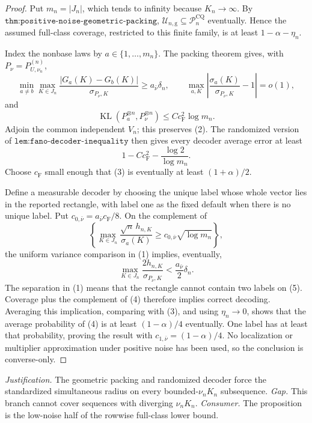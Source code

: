 \documentclass{article}
\begin{document}
\begin{proof}
Put \(m_n=|J_n|\), which tends to infinity because \(K_n\to\infty\).  By \(\texttt{thm:positive-noise-geometric-packing}\), \(\mathcal U_{n,\mathrm g}\subseteq\mathcal P_n^{\mathrm{CQ}}\) eventually.  Hence the assumed full-class coverage, restricted to this finite family, is at least \(1-\alpha-\eta_n\).

Index the nonbase laws by \(a\in\{1,\ldots,m_n\}\).  The packing theorem gives, with \(P_\nu=P_{U,\nu_n}^{(n)}\),
\[
 \min_{a\ne b}\max_{K\in J_n}
 \frac{|G_a(K)-G_b(K)|}{\sigma_{P_\nu,K}}
 \geq a_{\bar\nu}\delta_n,\qquad
 \max_{a,K}\left|\frac{\sigma_a(K)}{\sigma_{P_\nu,K}}-1\right|=o(1),                  \tag{1}
\]
and
\[
 \operatorname{KL}(P_a^{\otimes n},P_\nu^{\otimes n})
 \leq Cc_{\mathrm F}^2\log m_n.                                                         \tag{2}
\]
Adjoin the common independent \(V_n\); this preserves (2).  The randomized version of \(\texttt{lem:fano-decoder-inequality}\) then gives every decoder average error at least
\[
 1-Cc_{\mathrm F}^2-\frac{\log2}{\log m_n}.                                             \tag{3}
\]
Choose \(c_{\mathrm F}\) small enough that (3) is eventually at least \((1+\alpha)/2\).

Define a measurable decoder by choosing the unique label whose whole vector lies in the reported rectangle, with label one as the fixed default when there is no unique label.  Put \(c_{0,\bar\nu}=a_{\bar\nu}c_{\mathrm F}/8\).  On the complement of
\[
 \left\{\max_{K\in J_n}\frac{\sqrt n\,h_{n,K}}{\sigma_a(K)}
 \geq c_{0,\bar\nu}\sqrt{\log m_n}\right\},                                          \tag{4}
\]
the uniform variance comparison in (1) implies, eventually,
\[
 \max_{K\in J_n}\frac{2h_{n,K}}{\sigma_{P_\nu,K}}
 <\frac{a_{\bar\nu}}2\delta_n.                                                         \tag{5}
\]
The separation in (1) means that the rectangle cannot contain two labels on (5).  Coverage plus the complement of (4) therefore implies correct decoding.  Averaging this implication, comparing with (3), and using \(\eta_n\to0\), shows that the average probability of (4) is at least \((1-\alpha)/4\) eventually.  One label has at least that probability, proving the result with \(c_{1,\bar\nu}=(1-\alpha)/4\).  No localization or multiplier approximation under positive noise has been used, so the conclusion is converse-only.
\end{proof}
\par\smallskip\noindent \textit{Justification.} The geometric packing and randomized decoder force the standardized simultaneous radius on every bounded-\(\nu_nK_n\) subsequence. \textit{Gap.} This branch cannot cover sequences with diverging \(\nu_nK_n\). \textit{Consumer.} The proposition is the low-noise half of the rowwise full-class lower bound.
\end{document}
